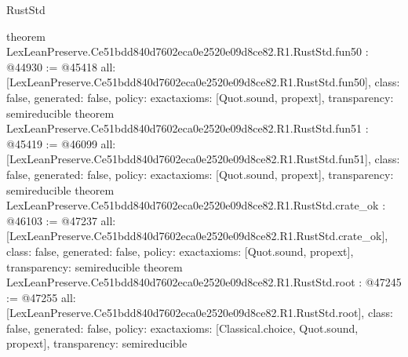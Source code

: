\begin{lexlean}{RustStd}
\begin{coremodule}
{}
theorem LexLeanPreserve.Ce51bdd840d7602eca0e2520e09d8ce82.R1.RustStd.fun50 : @44930 := @45418 {
  all: [LexLeanPreserve.Ce51bdd840d7602eca0e2520e09d8ce82.R1.RustStd.fun50],
  class: false,
  generated: false,
  policy: exact{axioms: [Quot.sound, propext]},
  transparency: semireducible
}
theorem LexLeanPreserve.Ce51bdd840d7602eca0e2520e09d8ce82.R1.RustStd.fun51 : @45419 := @46099 {
  all: [LexLeanPreserve.Ce51bdd840d7602eca0e2520e09d8ce82.R1.RustStd.fun51],
  class: false,
  generated: false,
  policy: exact{axioms: [Quot.sound, propext]},
  transparency: semireducible
}
theorem LexLeanPreserve.Ce51bdd840d7602eca0e2520e09d8ce82.R1.RustStd.crate_ok : @46103 := @47237 {
  all: [LexLeanPreserve.Ce51bdd840d7602eca0e2520e09d8ce82.R1.RustStd.crate_ok],
  class: false,
  generated: false,
  policy: exact{axioms: [Quot.sound, propext]},
  transparency: semireducible
}
theorem LexLeanPreserve.Ce51bdd840d7602eca0e2520e09d8ce82.R1.RustStd.root : @47245 := @47255 {
  all: [LexLeanPreserve.Ce51bdd840d7602eca0e2520e09d8ce82.R1.RustStd.root],
  class: false,
  generated: false,
  policy: exact{axioms: [Classical.choice, Quot.sound, propext]},
  transparency: semireducible
}


\end{coremodule}
\end{lexlean}
